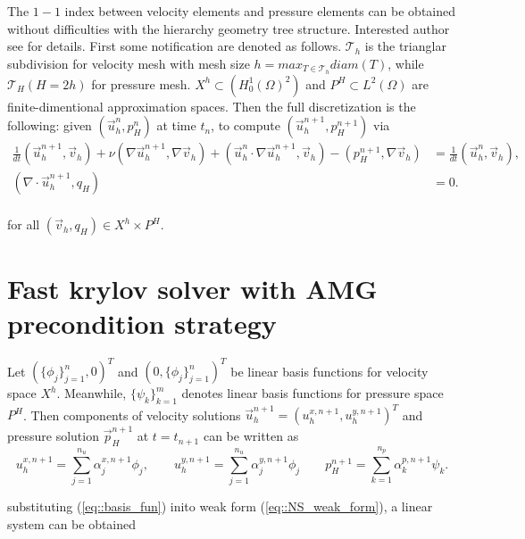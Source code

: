\documentclass{eajam}
\begin{document}
   The $1-1$ index between velocity elements and pressure elements can
   be obtained without difficulties with the hierarchy geometry tree
   structure. Interested author see \cite{Wu2016moving} for
   details. First some notification are denoted as
   follows. $\mathcal{T}_h$ is the trianglar subdivision for velocity
   mesh with mesh size $h = max_{T \in \mathcal{T}_h} diam(T)$, while
   $\mathcal{T}_{H}(H = 2h)$ for pressure mesh. $X^h \subset
   (H_0^1(\Omega)^2)$ and $P^H \subset L^2(\Omega)$ are
   finite-dimentional approximation spaces. Then the full
   discretization is the following: given $(\vec{u}_h^n, p_H^n)$ at
   time $t_n$, to compute $(\vec{u}_h^{n + 1}, p_H^{n + 1})$ via 
   \begin{equation}
     \begin{aligned}
       \frac{1}{dt}(\vec{u}_h^{n + 1}, \vec{v}_h) + \nu (\nabla
       \vec{u}_h^{n + 1}, \nabla \vec{v}_h) + (\vec{u}_h^n \cdot
       \nabla \vec{u}_h^{n + 1}, \vec{v}_h) - (p_H^{n + 1}, \nabla
       \vec{v}_h) & = \frac{1}{dt}(\vec{u}_h^n, \vec{v}_h), & \\
       (\nabla \cdot \vec{u}_h^{n + 1}, q_H) & = 0.& \\
     \end{aligned}
     \label{eq::NS_weak_form}
   \end{equation}
   
   for all $(\vec{v}_h, q_H) \in X^h \times P^H$.

\section{Fast krylov solver with AMG precondition strategy}
  \label{sec3} Let $\left(\{\phi_j \}_{j = 1}^n, 0 \right)^T$ and
  $\left(0, \{\phi_j\}_{j = 1}^n\right)^T$ be linear basis functions
  for velocity space $X^h$. Meanwhile, $\{\psi_k\}_{k =
    1}^m$ denotes linear basis functions for pressure space
  $P^H$. Then components of velocity solutions
  $\vec{u}_h^{n + 1} = (u_h^{x, n + 1}, u_h^{y, n + 1})^T$ and pressure
  solution $\vec{p}_H^{n + 1}$ at $t = t_{n + 1}$ can be written as 
  \begin{equation}
    u_h^{x, n + 1} = \sum_{j = 1}^{n_u} \alpha_j^{x, n + 1} \phi_j,
    \qquad u_h^{y, n + 1} = \sum_{j = 1}^{n_u} \alpha_j^{y, n + 1}
    \phi_j \qquad p_H^{n + 1} = \sum_{k = 1}^{n_p}\alpha_k^{p, n + 1}
    \psi_k.
    \label{eq::basis_fun}
  \end{equation}
  
  substituting (\ref{eq::basis_fun}) inito weak form
  (\ref{eq::NS_weak_form}), a linear system can be obtained
  
\end{document}
